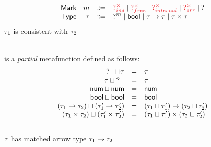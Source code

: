\documentclass{article}
\begin{document}
\[\begin{array}{rrcl}
  \normalfont\textsf{Mark}     & m & \Coloneqq & \TUnknownErr{ins} \mid \TUnknownErr{free} \mid \TUnknownErr{internal} \mid \TUnknownErr{err} \mid \TUnknown \\
  \TMName  & \TMV  & \Coloneqq & \TUnknown^{m} \mid \TBool \mid \TArrow{\TMV}{\TMV} \mid \TProd{\TMV}{\TMV} \\
\end{array}\]
%
 $\TMV_1$ is consistent with $\TMV_2$
%
\begin{mathpar}




\end{mathpar} \\
%
 is a \emph{partial} metafunction defined as follows:
%
\newcommand{\joinsTo}[3]{\ensuremath{\TJoin{#1}{#2} & = & #3}}
\[\begin{array}{rcl}
  \joinsTo{\TUnknown^{\_}}{\TMV}{\TMV} \\
  \joinsTo{\TMV}{\TUnknown^{\_}}{\TMV} \\
  \joinsTo{\TNum}{\TNum}{\TNum} \\
  \joinsTo{\TBool}{\TBool}{\TBool} \\
  \joinsTo{(\TArrow{\TMV_1}{\TMV_2})}{(\TArrow{\TMV_1'}{\TMV_2'})}{\TArrow{(\TJoin{\TMV_1}{\TMV_1'})}{(\TJoin{\TMV_2}{\TMV_2'})}} \\
  \joinsTo{(\TProd{\TMV_1}{\TMV_2})}{(\TProd{\TMV_1'}{\TMV_2'})}{\TProd{(\TJoin{\TMV_1}{\TMV_1'})}{(\TJoin{\TMV_2}{\TMV_2'})}}
\end{array}\] \\
%
 $\TMV$ has matched arrow type $\TArrow{\TMV_1}{\TMV_2}$
%
\begin{mathpar}


\end{mathpar} \\
\end{document}
